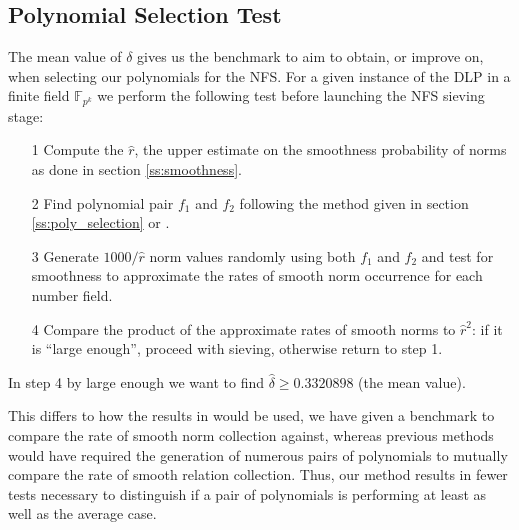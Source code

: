 \documentclass[a4paper, 12pt, envcountsect, runningheads]{llncs}
\newcommand{\F}{{\mathbb F}}
\numberwithin{figure}{section}
\numberwithin{equation}{section}
\begin{document}
\subsection{Polynomial Selection Test}
\label{ss:poly_test}
The mean value of $\delta$ gives us the benchmark to aim to obtain, or improve on, when selecting our polynomials for the NFS. For a given instance of the DLP in a finite field $\F_{p^k}$ we perform the following test before launching the NFS sieving stage:
\begin{itemize}
\item[1] Compute the $\hat{r}$, the upper estimate on the smoothness probability of norms as done in section \ref{ss:smoothness}.
\item[2] Find polynomial pair $f_1$ and $f_2$ following the method given in section \ref{ss:poly_selection} or \cite{joux-lercier-smart-vercauteren06}.
\item[3] Generate $1000/\hat{r}$ \cite{dan_predicting_nfs} norm values randomly using both $f_1$ and $f_2$ and test for smoothness to approximate the rates of smooth norm occurrence for each number field.
\item[4] Compare the product of the approximate rates of smooth norms to $\hat{r}^2$: if it is ``large enough'', proceed with sieving, otherwise return to step 1.
\end{itemize}
In step 4 by large enough we want to find $\hat{\delta}\geq0.3320898$ (the mean value).

This differs to how the results in \cite{zajac} would be used, we have given a benchmark to compare the rate of smooth norm collection against, whereas previous methods would have required the generation of numerous pairs of polynomials to mutually compare the rate of smooth relation collection. Thus, our method results in fewer tests necessary to distinguish if a pair of polynomials is performing at least as well as the average case.
\end{document}
